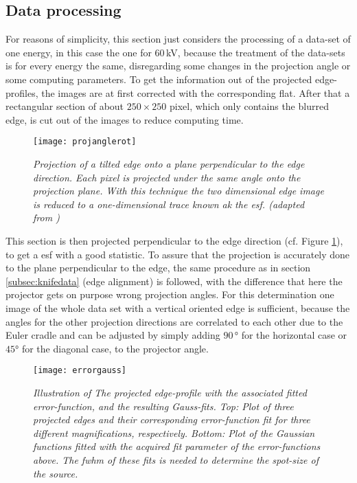 \subsection{Data processing}\label{subsec:edgeprocessing}
For reasons of simplicity, this section just considers the processing of a data-set of one energy, in this case the one for $60\,$kV, because the treatment of the data-sets is for every energy the same, disregarding some changes in the projection angle or some computing parameters. To get the information out of the projected edge-profiles, the images are at first corrected with the corresponding \gls{flat}. After that a rectangular section of about $250\times250$ pixel, which only contains the blurred edge, is cut out of the images to reduce computing time.
\begin{figure}[h]
	\begin{center}
		\texttt{[image: projanglerot]}
	\end{center}
	\caption[Illustration of the projection of an edge profile ]{\textit{Projection of a tilted edge onto a plane perpendicular to the edge direction. Each pixel is projected under the same angle onto the projection plane. With this technique the two dimensional edge image is reduced to a one-dimensional trace known ak the \gls{esf}. \tiny{(adapted from \citep{Samei1998})}}}
	\label{edgeangle}
\end{figure}
This section is then projected perpendicular to the edge direction (cf. Figure \ref{edgeangle}), to get a \gls{esf} with a good statistic. To assure that the projection is accurately done to the plane perpendicular to the edge, the same procedure as in section \ref{subsec:knifedata} (edge alignment) is followed, with the difference that here the projector gets on purpose wrong projection angles. For this determination one image of the whole data set with a vertical oriented edge is sufficient, because the angles for the other projection directions are correlated to each other due to the Euler cradle and can be adjusted by simply adding $90\,$° for the horizontal case or $45$° for the diagonal case, to the projector angle. 
\begin{figure}[h]
	\begin{center}
		\texttt{[image: errorgauss]}
	\end{center}
	\caption[Fit of the projection of the projected edge and corresponding Gauss-fits]{\textit{Illustration of The projected edge-profile with the associated fitted error-function, and the resulting Gauss-fits. Top: Plot of three projected edges and their corresponding error-function fit for three different magnifications, respectively. Bottom: Plot of the Gaussian functions fitted with the acquired fit parameter of the error-functions above. The \gls{fwhm} of these fits is needed to determine the spot-size of the source.}}
	\label{errorgauss}
\end{figure}
